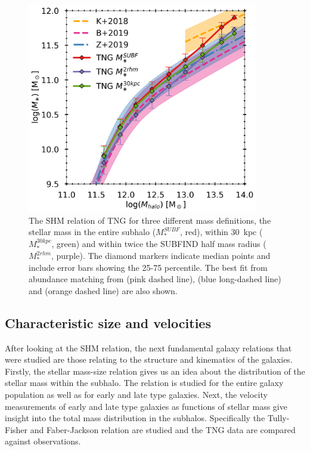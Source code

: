 \begin{figure}
    \centering
    \includegraphics[width=0.9\textwidth]{images/shmr.png}
    \caption{The SHM relation of TNG for three different mass definitions, the stellar mass in the entire subhalo ($M_\ast^{SUBF}$, red), within 30$\,$ kpc ($M_\ast^{30kpc}$, green) and within twice the SUBFIND half mass radius ($M_\ast^{2rhm}$, purple). The diamond markers indicate median points and include error bars showing the 25-75 percentile. The best fit from abundance matching from \textcite{Behroozi2019} (pink dashed line), \textcite{Zanisi2019} (blue long-dashed line) and \textcite{Kravtsov2018} (orange dashed line) are also shown.}
    \label{shmr}
\end{figure}


\subsection{Characteristic size and velocities}
After looking at the SHM relation, the next fundamental galaxy relations that were studied are those relating to the structure and kinematics of the galaxies. Firstly, the stellar mass-size relation gives us an idea about the distribution of the stellar mass within the subhalo. The relation is studied for the entire galaxy population as well as for early and late type galaxies. Next, the velocity measurements of early and late type galaxies as functions of stellar mass give insight into the total mass distribution in the subhalos. Specifically the Tully-Fisher and Faber-Jackson relation are studied and the TNG data are compared against observations.

